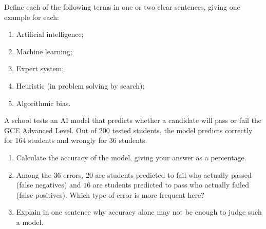 \documentclass[11pt]{article}
\newcommand{\cle}[1]{{\popxbold\color{popdark}#1}}
\newcounter{popsec}
\newcounter{popsub}
\newcommand{\courssub}[1]{%
  \stepcounter{popsub}%
  \par\vspace{9pt}\noindent{\popxbold\fontsize{11.5}{13}\selectfont\color{popink}{\color{poporange}\thepopsec.\thepopsub}\hspace{6pt}#1}\par\nopagebreak\vspace{4pt}
}
\begin{document}
\begin{exercice}
Define each of the following terms in one or two clear sentences, giving one example for each:
\begin{enumerate}
\item Artificial intelligence;
\item Machine learning;
\item Expert system;
\item Heuristic (in problem solving by search);
\item Algorithmic bias.
\end{enumerate}
\end{exercice}

\begin{exercice}
A school tests an AI model that predicts whether a candidate will pass or fail the GCE Advanced Level. Out of $200$ tested students, the model predicts correctly for $164$ students and wrongly for $36$ students.
\begin{enumerate}
\item Calculate the \cle{accuracy} of the model, giving your answer as a percentage.
\item Among the $36$ errors, $20$ are students predicted to fail who actually passed (false negatives) and $16$ are students predicted to pass who actually failed (false positives). Which type of error is more frequent here?
\item Explain in one sentence why accuracy alone may not be enough to judge such a model.
\end{enumerate}
\end{exercice}

\courssub{I practise}
\end{document}
